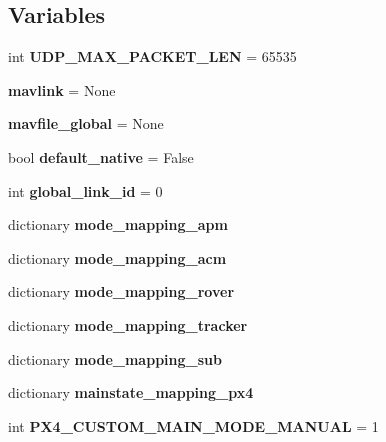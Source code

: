 \subsection*{Variables}
\begin{DoxyCompactItemize}
\item 
\mbox{\label{namespacepymavlink_1_1mavutil_a1fce3ac17837c857546999343dbd5bc3}} 
int {\bfseries U\+D\+P\+\_\+\+M\+A\+X\+\_\+\+P\+A\+C\+K\+E\+T\+\_\+\+L\+EN} = 65535
\item 
\mbox{\label{namespacepymavlink_1_1mavutil_abae56506546c35864f22d14ba69c235f}} 
{\bfseries mavlink} = None
\item 
\mbox{\label{namespacepymavlink_1_1mavutil_a08066205cd90c34fb96e4c0e2be4ce59}} 
{\bfseries mavfile\+\_\+global} = None
\item 
\mbox{\label{namespacepymavlink_1_1mavutil_a21ce9da7b698a7bc21c44b9f77341b62}} 
bool {\bfseries default\+\_\+native} = False
\item 
\mbox{\label{namespacepymavlink_1_1mavutil_a7a6fe2ed1668de666146b7bb892dad47}} 
int {\bfseries global\+\_\+link\+\_\+id} = 0
\item 
dictionary {\bfseries mode\+\_\+mapping\+\_\+apm}
\item 
dictionary {\bfseries mode\+\_\+mapping\+\_\+acm}
\item 
dictionary {\bfseries mode\+\_\+mapping\+\_\+rover}
\item 
dictionary {\bfseries mode\+\_\+mapping\+\_\+tracker}
\item 
dictionary {\bfseries mode\+\_\+mapping\+\_\+sub}
\item 
dictionary {\bfseries mainstate\+\_\+mapping\+\_\+px4}
\item 
\mbox{\label{namespacepymavlink_1_1mavutil_ac79afe08d501c6cc0630ced7681307ae}} 
int {\bfseries P\+X4\+\_\+\+C\+U\+S\+T\+O\+M\+\_\+\+M\+A\+I\+N\+\_\+\+M\+O\+D\+E\+\_\+\+M\+A\+N\+U\+AL} = 1
\item 
\mbox{\label{namespacepymavlink_1_1mavutil_a6e29a5d8b34ab1b9922e6e1a28f6057a}} 

\end{DoxyCompactItemize}
